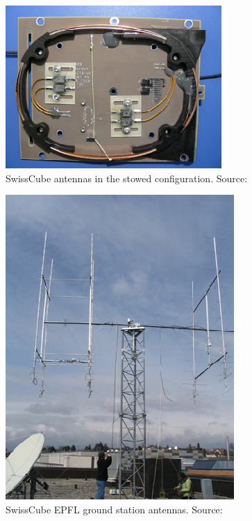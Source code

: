 \begin{minipage}{\linewidth}
    \centering
    \begin{minipage}{0.45\linewidth}
        \begin{figure}[H]
            \centering
            \includegraphics[width=0.32\paperwidth]{img/4/swisscube_stowed.png}
            \caption{SwissCube antennas in the stowed configuration. Source: \cite{swisscube_stowed}}
            \label{swisscube_stowed}
        \end{figure}
    \end{minipage}
    \hspace{0.05\linewidth}
    \begin{minipage}{0.45\linewidth}
        \begin{figure}[H]
            \centering
            \includegraphics[width=0.32\paperwidth]{img/4/swisscube_groundstation.png}
            \caption{SwissCube EPFL ground station antennas. Source: \cite{swisscube_groundstation}}
            \label{PW-swisscube_groundstation}
        \end{figure}
    \end{minipage}
\end{minipage}